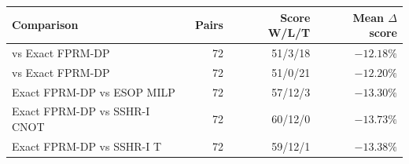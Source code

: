 \begin{tabular}{lrrr}
\toprule
Comparison & Pairs & Score W/L/T & Mean $\Delta$ score \\
\midrule
\method{} vs Exact FPRM-DP & 72 & 51/3/18 & $-12.18\%$ \\
\paretomethod{} vs Exact FPRM-DP & 72 & 51/0/21 & $-12.20\%$ \\
Exact FPRM-DP vs ESOP MILP & 72 & 57/12/3 & $-13.30\%$ \\
Exact FPRM-DP vs SSHR-I CNOT & 72 & 60/12/0 & $-13.73\%$ \\
Exact FPRM-DP vs SSHR-I T & 72 & 59/12/1 & $-13.38\%$ \\
\bottomrule
\end{tabular}
